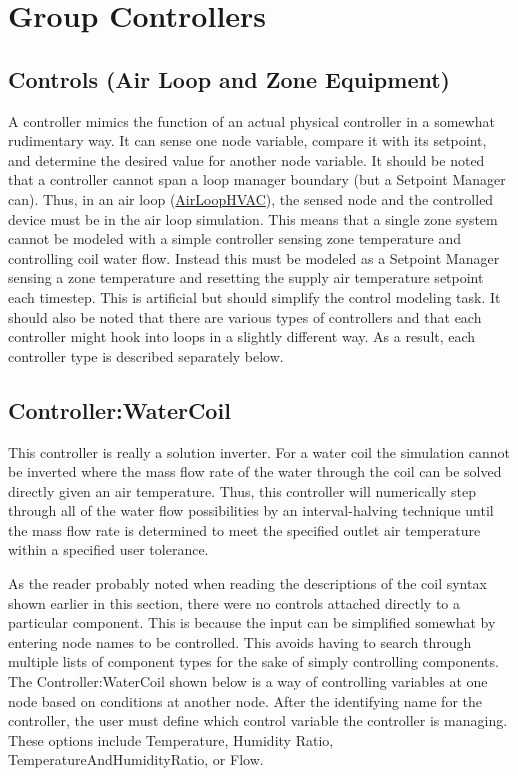 \section{Group Controllers}\label{group-controllers}

\subsection{Controls (Air Loop and Zone Equipment)}\label{controls-air-loop-and-zone-equipment}

A controller mimics the function of an actual physical controller in a somewhat rudimentary way. It can sense one node variable, compare it with its setpoint, and determine the desired value for another node variable. It should be noted that a controller cannot span a loop manager boundary (but a Setpoint Manager can). Thus, in an air loop (\hyperref[airloophvac]{AirLoopHVAC}), the sensed node and the controlled device must be in the air loop simulation. This means that a single zone system cannot be modeled with a simple controller sensing zone temperature and controlling coil water flow. Instead this must be modeled as a Setpoint Manager sensing a zone temperature and resetting the supply air temperature setpoint each timestep. This is artificial but should simplify the control modeling task. It should also be noted that there are various types of controllers and that each controller might hook into loops in a slightly different way. As a result, each controller type is described separately below.

\subsection{Controller:WaterCoil}\label{controllerwatercoil}

This controller is really a solution inverter. For a water coil the simulation cannot be inverted where the mass flow rate of the water through the coil can be solved directly given an air temperature. Thus, this controller will numerically step through all of the water flow possibilities by an interval-halving technique until the mass flow rate is determined to meet the specified outlet air temperature within a specified user tolerance.

As the reader probably noted when reading the descriptions of the coil syntax shown earlier in this section, there were no controls attached directly to a particular component. This is because the input can be simplified somewhat by entering node names to be controlled. This avoids having to search through multiple lists of component types for the sake of simply controlling components. The Controller:WaterCoil shown below is a way of controlling variables at one node based on conditions at another node. After the identifying name for the controller, the user must define which control variable the controller is managing. These options include Temperature, Humidity Ratio, TemperatureAndHumidityRatio, or Flow.

